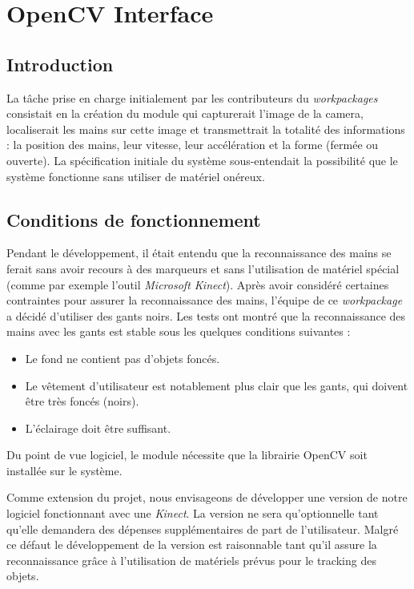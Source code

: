 \section*{OpenCV Interface}
\subsection*{Introduction}
\par La tâche prise en charge initialement par les contributeurs du \emph{workpackages} consistait en la création du module qui capturerait l'image de la camera, localiserait les mains sur cette image et transmettrait la totalité des informations : la position des mains, leur vitesse, leur accélération et la forme (fermée ou ouverte). La spécification initiale du système sous-entendait la possibilité que le système fonctionne sans utiliser de matériel onéreux.
\subsection*{Conditions de fonctionnement}
\par Pendant le développement, il était entendu que la reconnaissance des mains se ferait sans avoir recours à des marqueurs et sans l'utilisation de matériel spécial (comme par exemple l'outil \emph{Microsoft Kinect}). Après avoir considéré certaines contraintes pour assurer la reconnaissance des mains, l'équipe de ce \emph{workpackage} a décidé d'utiliser des gants noirs. Les tests ont montré que la reconnaissance des mains avec les gants est stable sous les quelques conditions suivantes : 
\begin{itemize}
\item Le fond ne contient pas d'objets foncés.
\item Le vêtement d'utilisateur est notablement plus clair que les gants, qui doivent être très foncés (noirs).
\item L'éclairage doit être suffisant. 
\end{itemize}
\par Du point de vue logiciel, le module nécessite que la librairie OpenCV soit installée sur le système. 
\par Comme extension du projet, nous envisageons de développer une version de notre logiciel fonctionnant avec une \emph{Kinect}. La version ne sera qu'optionnelle tant qu'elle demandera des dépenses supplémentaires de part de l'utilisateur. Malgré ce défaut le développement de la version est raisonnable tant qu'il assure la reconnaissance grâce à l'utilisation de matériels prévus pour le tracking des objets. 
